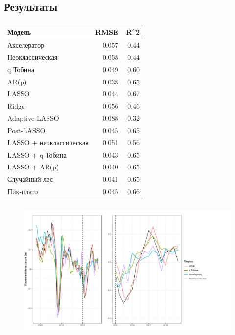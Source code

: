 \documentclass[c, dvipsnames]{beamer}  %
\begin{document}
\subsection{Результаты}
 
 \begin{frame}
 \frametitle{\insertsection} 
\framesubtitle{\insertsubsection}
\begin{table}[ht]
\centering
\begin{tabular}{lrr}
  \hline
Модель & RMSE & R^2  \\ 
  \hline
  Акселератор & 0.057 & 0.44 \\
  Неоклассическая & 0.058 & 0.44 \\
  q Тобина & 0.049 & 0.60 \\
  AR(p) & \alert{0.038} & \alert{0.65} \\
  \hline
  LASSO & 0.044 & 0.67 \\
  Ridge & 0.056 & 0.46 \\
  Adaptive LASSO & 0.088 & -0.32 \\
  Post-LASSO & 0.045 &  0.65 \\
  \hline
  LASSO + неоклассическая & 0.051 & 0.56 \\
  LASSO + q Тобина & 0.043 &0.65 \\
  LASSO + AR(p) & 0.040 & 0.65 \\
   \hline 
   Случайный лес & 0.041 & 0.65 \\
   Пик-плато &0.045 & 0.66 \\
   \hline 
\end{tabular}
\end{table}
\end{frame}

 \begin{frame}
\frametitle{\insertsection} 
\framesubtitle{\insertsubsection}
\begin{figure}
\includegraphics[width=\linewidth]{lineplot1.pdf}
\end{figure}
\end{frame} 
\end{document}
